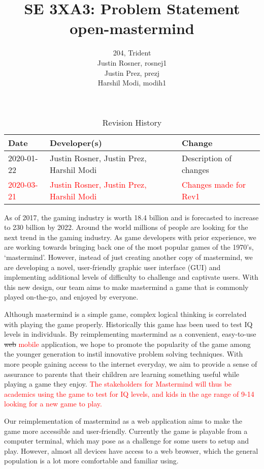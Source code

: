 \documentclass{article}
\title{SE 3XA3: Problem Statement\\open-mastermind}
\author{204, Trident
		\\ Justin Rosner, rosnej1
		\\ Justin Prez, prezj
		\\ Harshil Modi, modih1
}
\date{}
\begin{document}
\begin{table}[hp]
\caption{Revision History} \label{TblRevisionHistory}
\begin{tabularx}{\textwidth}{llX}
\toprule
\textbf{Date} & \textbf{Developer(s)} & \textbf{Change}\\
\midrule
2020-01-22 & Justin Rosner, Justin Prez, Harshil Modi & Description of changes\\
\textcolor{red}{2020-03-21} & \textcolor{red}{Justin Rosner, Justin Prez, Harshil Modi} & \textcolor{red}{Changes made for Rev1}\\
\bottomrule
\end{tabularx}
\end{table}

\newpage

\maketitle

As of 2017, the gaming industry is worth 18.4 billion and is forecasted to increase to 230 billion by 2022. Around the world millions of people are looking for the next trend in the gaming industry. As game developers with prior experience, we are working towards bringing back one of the most popular games of the 1970’s, ‘mastermind’. However, instead of just creating another copy of mastermind, we are developing a novel, user-friendly graphic user interface (GUI) and implementing additional levels of difficulty to challenge and captivate users. With this new design, our team aims to make mastermind a game that is commonly played on-the-go, and enjoyed by everyone.

Although mastermind is a simple game, complex logical thinking is correlated with playing the game properly. Historically this game has been used to test IQ levels in individuals. By reimplementing mastermind as a convenient, easy-to-use \sout{web} \textcolor{red}{mobile} application, we hope to promote the popularity of the game among the younger generation to instil innovative problem solving techniques. With more people gaining access to the internet everyday, we aim to provide a sense of assurance to parents that their children are learning something useful while playing a game they enjoy. \textcolor{red}{The stakeholders for Mastermind will thus be academics using the game to test for IQ levels, and kids in the age range of 9-14 looking for a new game to play.}

Our reimplementation of mastermind as a web application aims to make the game more accessible and user-friendly. Currently the game is playable from a computer terminal, which may pose as a challenge for some users to setup and play. However, almost all devices have access to a web browser, which the general population is a lot more comfortable and familiar using.





\end{document}
